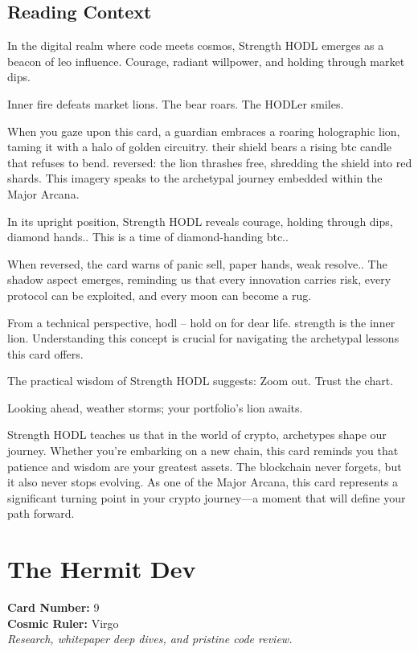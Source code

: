 \documentclass[11pt,oneside]{book}
\begin{document}
\begin{minipage}[t]{0.55\textwidth}
  \subsection*{Reading Context}
  In the digital realm where code meets cosmos, Strength HODL emerges as a beacon of leo influence. Courage, radiant willpower, and holding through market dips.

  Inner fire defeats market lions. The bear roars. The HODLer smiles.

  When you gaze upon this card, a guardian embraces a roaring holographic lion, taming it with a halo of golden circuitry. their shield bears a rising btc candle that refuses to bend. reversed: the lion thrashes free, shredding the shield into red shards. This imagery speaks to the archetypal journey embedded within the Major Arcana.

  In its upright position, Strength HODL reveals courage, holding through dips, diamond hands.. This is a time of diamond-handing btc..

  When reversed, the card warns of panic sell, paper hands, weak resolve.. The shadow aspect emerges, reminding us that every innovation carries risk, every protocol can be exploited, and every moon can become a rug.

  From a technical perspective, hodl – hold on for dear life. strength is the inner lion. Understanding this concept is crucial for navigating the archetypal lessons this card offers.

  The practical wisdom of Strength HODL suggests: Zoom out. Trust the chart.

  Looking ahead, weather storms; your portfolio's lion awaits.

  Strength HODL teaches us that in the world of crypto, archetypes shape our journey. Whether you're embarking on a new chain, this card reminds you that patience and wisdom are your greatest assets. The blockchain never forgets, but it also never stops evolving. As one of the Major Arcana, this card represents a significant turning point in your crypto journey—a moment that will define your path forward.

\end{minipage}

\newpage
\section*{The Hermit Dev}

\begin{minipage}[t]{0.55\textwidth}
  \vspace{0pt}
  \textbf{Card Number:} 9\\  \textbf{Cosmic Ruler:} Virgo\\  \textit{Research, whitepaper deep dives, and pristine code review.}
\end{minipage}
\end{document}
